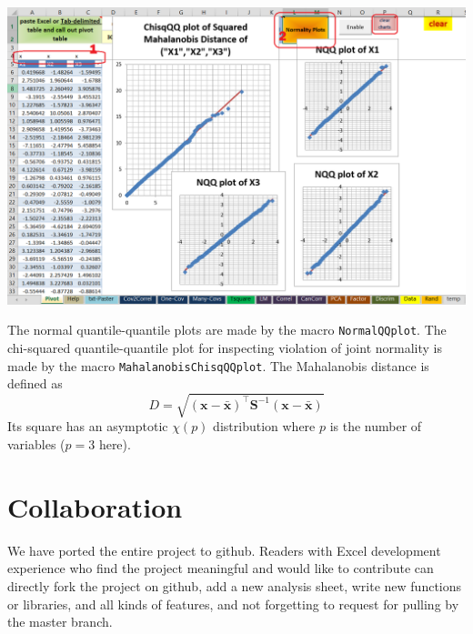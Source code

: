 \documentclass[article]{jss}
\numberwithin{equation}{subsection}
\begin{document}
\begin{enumerate}
\begin{center}
	        \includegraphics[width=\linewidth, keepaspectratio=true]{PivotSheetNormalityPlots_png}
        \end{center}
        The normal quantile-quantile plots are made by the  macro \texttt{NormalQQplot}. The chi-squared quantile-quantile plot for inspecting violation of joint normality is made by the macro \texttt{MahalanobisChisqQQplot}. The Mahalanobis distance is defined as \[D = \sqrt {{{\left( {\textbf{x} - \bar{\textbf{x}}} \right)}^ \intercal }{\textbf{S}^{ - 1}}\left( {\textbf{x} - \bar{\textbf{x}}} \right)} \]
        Its square has an asymptotic $\chi(p)$ distribution where $p$ is the number of variables ($p=3$ here).
        \end{enumerate}
        
        
        
        \section[software]{Collaboration}
        We have ported the entire project to github. Readers with Excel development experience who find the project meaningful and would like to contribute can directly fork the project on github, add a new analysis sheet, write new functions or libraries, and all kinds of features, and not forgetting to request for pulling by the master branch.
        
\end{document}
